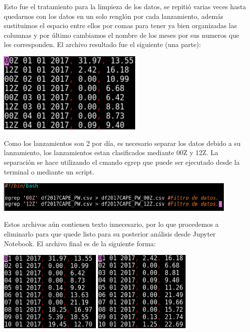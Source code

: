 \documentclass[12pt]{article}
\begin{document}
Esto fue el tratamiento para la limpieza de los datos, se repitió varias veces hasta quedarnos con los datos en un solo renglón por cada lanzamiento, además sustituimos el espacio entre ellos por comas para tener ya bien organizadas las columnas y por último cambiamos el nombre de los meses por sus numeros que les corresponden. El archivo resultado fue el siguiente (una parte):
\begin{center}
	\includegraphics[height=4cm]{datos.png}
\end{center}
Como los lanzamientos son 2 por día, es necesario separar los datos debido a su lanzamiento, los lanzamientos estan clasificados mediante 00Z y 12Z. La separación se hace utilizando el cmando egrep que puede ser ejecutado desde la terminal o mediante un script.
\begin{center}
	\includegraphics[height=1.5cm]{losscript.png}
\end{center}
Estos archivos aún contienen texto innecesario, por lo que procedemos a eliminarlo para que quede listo para su posterior análisis desde Jupyter Notebook. El archivo final es de la siguiente forma:
\begin{center}
	\includegraphics[height=4cm]{datosfinal.png} \hspace*{\fill}
    \includegraphics[height=4cm]{datosfinal2.png}
\end{center}
\end{document}
